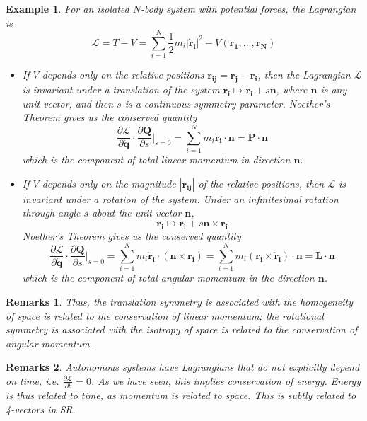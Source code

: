 \documentclass[a4paper]{article}
\newtheorem{remarks}{Remarks}[section]
\newtheorem{eg}{Example}[section]
\theoremstyle{new}
\begin{document}
\begin{eg}
For an isolated $N$-body system with potential forces, the Lagrangian is
$$\mathcal{L}=T-V=\sum_{i=1}^N\frac{1}{2}m_i|\mathbf{\dot{r}_i}|^2-V(\mathbf{r_1},...,\mathbf{r_N})$$
\begin{itemize}
\item If $V$ depends only on the relative positions $\mathbf{r_{ij}}=\mathbf{r_j}-\mathbf{r_i}$, then the Lagrangian $\mathcal{L}$ is invariant under a translation of the system $\mathbf{r_i}\mapsto\mathbf{r_i}+s\mathbf{n}$, where $\mathbf{n}$ is any unit vector, and then $s$ is a continuous symmetry parameter. Noether's Theorem gives us the conserved quantity
$$\frac{\partial\mathcal{L}}{\partial\mathbf{\dot{q}}}\cdot\frac{\partial\mathbf{Q}}{\partial s}\bigg|_{s=0}=\sum_{i=1}^Nm_i\mathbf{\dot{r}_i}\cdot\mathbf{n}=\mathbf{P}\cdot\mathbf{n}$$
which is the component of total linear momentum in direction $\mathbf{n}$.
\item If $V$ depends only on the magnitude $|\mathbf{r_{ij}}|$ of the relative positions, then $\mathcal{L}$ is invariant under a rotation of the system. Under an infinitesimal rotation through angle $s$ about the unit vector $\mathbf{n}$, 
$$\mathbf{r_i}\mapsto\mathbf{r_i}+s\mathbf{n}\times\mathbf{r_i}$$
Noether's Theorem gives us the conserved quantity 
$$\frac{\partial\mathcal{L}}{\partial\mathbf{\dot{q}}}\cdot\frac{\partial\mathbf{Q}}{\partial s}\bigg|_{s=0}=\sum_{i=1}^Nm_i\mathbf{\dot{r}_i}\cdot(\mathbf{n}\times\mathbf{r_i})=\sum_{i=1}^Nm_i(\mathbf{r_i}\times\mathbf{\dot{r}_i})\cdot\mathbf{n}=\mathbf{L}\cdot\mathbf{n}$$
which is the component of total angular momentum in the direction $\mathbf{n}$. 
\end{itemize}
\end{eg}
\begin{remarks}
Thus, the translation symmetry is associated with the homogeneity of space is related to the conservation of linear momentum; the rotational symmetry is associated with the isotropy of space is related to the conservation of angular momentum.
\end{remarks}
\begin{remarks}
Autonomous systems have Lagrangians that do not explicitly depend on time, i.e. $\frac{\partial\mathcal{L}}{\partial t}=0$. As we have seen, this implies conservation of energy. Energy is thus related to time, as momentum is related to space. This is subtly related to 4-vectors in SR.
\end{remarks}
\newpage
\end{document}
